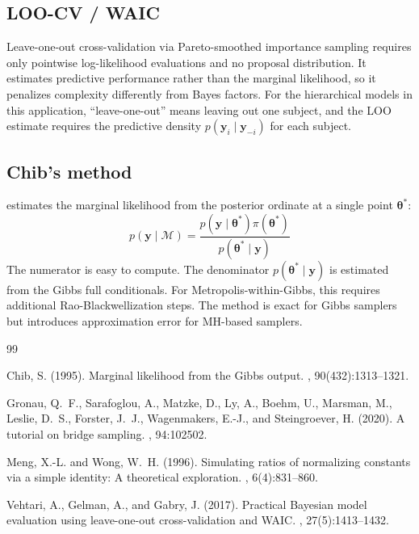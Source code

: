 \documentclass[11pt]{article}
\newcommand{\bth}{\boldsymbol{\theta}}
\newcommand{\by}{\mathbf{y}}
\newcommand{\cM}{\mathcal{M}}
\theoremstyle{plain}
\theoremstyle{definition}
\begin{document}
\subsection{LOO-CV / WAIC}

Leave-one-out cross-validation via Pareto-smoothed importance sampling
\citep{Vehtari2017} requires only pointwise log-likelihood evaluations and
no proposal distribution. It estimates predictive performance rather than the
marginal likelihood, so it penalizes complexity differently from Bayes
factors. For the hierarchical models in this application, ``leave-one-out''
means leaving out one subject, and the LOO estimate requires the predictive
density $p(\by_i \mid \by_{-i})$ for each subject.

\subsection{Chib's method}

\citet{Chib1995} estimates the marginal likelihood from the posterior
ordinate at a single point $\bth^*$:
\begin{equation}
  p(\by \mid \cM) = \frac{p(\by \mid \bth^*) \pi(\bth^*)}{p(\bth^* \mid \by)}
\end{equation}
The numerator is easy to compute. The denominator $p(\bth^* \mid \by)$ is
estimated from the Gibbs full conditionals. For Metropolis-within-Gibbs,
this requires additional Rao-Blackwellization steps. The method is exact
for Gibbs samplers but introduces approximation error for MH-based samplers.



\begin{thebibliography}{99}

Chib, S. (1995).
\newblock Marginal likelihood from the {G}ibbs output.
,
  90(432):1313--1321.

Gronau, Q.~F., Sarafoglou, A., Matzke, D., Ly, A., Boehm, U.,
  Marsman, M., Leslie, D.~S., Forster, J.~J., Wagenmakers, E.-J., and
  Steingroever, H. (2020).
\newblock A tutorial on bridge sampling.
, 94:102502.

Meng, X.-L. and Wong, W.~H. (1996).
\newblock Simulating ratios of normalizing constants via a simple identity:
  A theoretical exploration.
, 6(4):831--860.

Vehtari, A., Gelman, A., and Gabry, J. (2017).
\newblock Practical {B}ayesian model evaluation using leave-one-out
  cross-validation and {WAIC}.
, 27(5):1413--1432.

\end{thebibliography}
\end{document}
